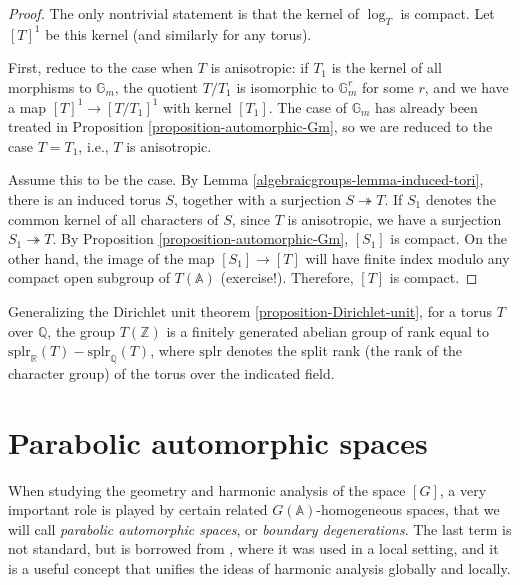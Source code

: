 \begin{proof}
 The only nontrivial statement is that the kernel of $\log_T$ is compact.  Let $[T]^1$ be this kernel (and similarly for any torus). 
 
 First, reduce to the case when $T$ is anisotropic: if $T_1$ is the kernel of all morphisms to $\mathbb G_m$, the quotient $T/T_1$ is isomorphic to $\mathbb G_m^r$ for some $r$, and we have a map $[T]^1 \to [T/T_1]^1$ with kernel $[T_1]$. The case of $\mathbb G_m$ has already been treated in Proposition \ref{proposition-automorphic-Gm}, so we are reduced to the case $T=T_1$, i.e., $T$ is anisotropic.
 
 Assume this to be the case. By Lemma \ref{algebraicgroups-lemma-induced-tori}, there is an induced torus $S$, together with a surjection $S\twoheadrightarrow T$. If $S_1$ denotes the common kernel of all characters of $S$, since $T$ is anisotropic, we have a surjection $S_1\twoheadrightarrow T$. By Proposition \ref{proposition-automorphic-Gm}, $[S_1]$ is compact. On the other hand, the image of the map $[S_1]\to [T]$ will have finite index modulo any compact open subgroup of $T(\mathbb A)$ (exercise!). Therefore, $[T]$ is compact.
\end{proof}

\begin{remark}
 \label{remark-Dirichlet-unit-torus}
 Generalizing the Dirichlet unit theorem \ref{proposition-Dirichlet-unit}, for a torus $T$ over $\mathbb Q$, the group $T(\mathbb Z)$ is a finitely generated abelian group of rank equal to $\mbox{splr}_{\mathbb R}(T) - \mbox{splr}_{\mathbb Q}(T)$, where $\mbox{splr}$ denotes the split rank (the rank of the character group) of the torus over the indicated field.
\end{remark}



\section{Parabolic automorphic spaces}
\label{section-boundary-degenerations}

When studying the geometry and harmonic analysis of the space $[G]$, a very important role is played by certain related $G(\mathbb A)$-homogeneous spaces, that we will call \emph{parabolic automorphic spaces}, or \emph{boundary degenerations}. The last term is not standard, but is borrowed from \cite{Sakellaridis-Venkatesh}, where it was used in a local setting, and it is a useful concept that unifies the ideas of harmonic analysis globally and locally.

